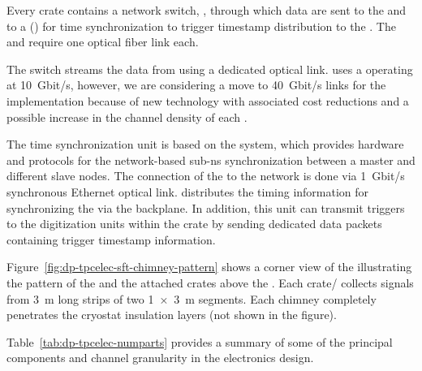Every  crate contains a network switch, , through which data are sent to the   and to a () for time synchronization to trigger timestamp distribution to the . %
The  and  require one optical fiber link each. 

The  switch streams the data from  using a dedicated optical link. %
 uses a  operating at \SI{10}{Gbit/s}, however, we are considering a move to \SI{40}{Gbit/s} links for the  implementation because of new technology with associated cost reductions and a possible increase in the channel density of each .

The  time synchronization unit is based on the  system, which provides hardware and protocols for the network-based sub-\si{\nano\s} synchronization between a master and different slave nodes. The connection of the  to the  network is done via \SI{1}{Gbit/s} synchronous Ethernet optical link.  distributes the timing information for synchronizing the  via the  backplane. In addition, this unit can %
transmit triggers to the digitization units within the crate by sending dedicated data packets containing trigger timestamp information. 

Figure~\ref{fig:dp-tpcelec-sft-chimney-pattern} shows a corner view of the  illustrating the pattern of the  and the attached  crates above the . Each crate/ collects signals from \SI{3}{\meter} long strips of two \SI[product-units=power]{1x3}{\meter}  segments. Each chimney completely %
penetrates the cryostat insulation layers (not shown in the figure). 

Table~\ref{tab:dp-tpcelec-numparts} provides a summary of some of the principal components and channel granularity in the \dual electronics design. 


